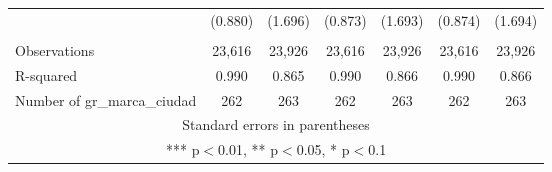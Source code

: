 \begin{tabular}{lcccccc}
 & (0.880) & (1.696) & (0.873) & (1.693) & (0.874) & (1.694) \\
 &  &  &  &  &  &  \\
Observations & 23,616 & 23,926 & 23,616 & 23,926 & 23,616 & 23,926 \\
R-squared & 0.990 & 0.865 & 0.990 & 0.866 & 0.990 & 0.866 \\
 Number of gr\_marca\_ciudad & 262 & 263 & 262 & 263 & 262 & 263 \\ \hline
\multicolumn{7}{c}{ Standard errors in parentheses} \\
\multicolumn{7}{c}{ *** p$<$0.01, ** p$<$0.05, * p$<$0.1} \\
\end{tabular}
